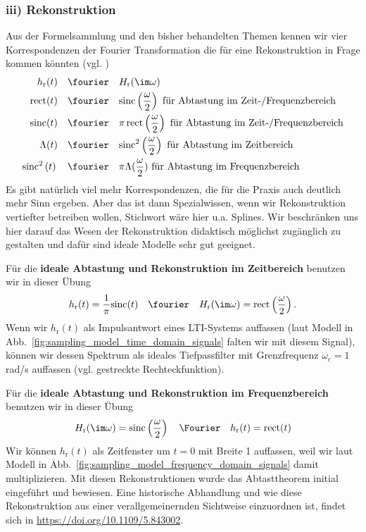 \subsubsection*{iii) Rekonstruktion}
Aus der Formelsammlung und den bisher behandelten Themen kennen wir vier
Korrespondenzen der Fourier Transformation die für eine Rekonstruktion
in Frage kommen könnten (vgl. )
\begin{align}
h_\mathrm{r}(t) \quad\fourier\quad  & H_\mathrm{r}(\im\omega)\\
\text{rect}(t) \quad\fourier\quad  &\text{sinc}\left( \frac{\omega}{2} \right)\text{ für Abtastung im Zeit-/Frequenzbereich}\\
\text{sinc}(t)  \quad\fourier\quad  &\pi \,\text{rect}\left(\frac{\omega}{2}\right)\text{ für Abtastung im Zeit-/Frequenzbereich}\\
\Lambda(t) \quad\fourier\quad  &\text{sinc}^2\left( \frac{\omega}{2} \right)  \text{ für Abtastung im Zeitbereich}\\
\text{sinc}^2\left( t \right) \quad\fourier\quad  &\pi\Lambda(\frac{\omega}{2})\text{ für Abtastung im Frequenzbereich}
\end{align}
Es gibt natürlich viel mehr Korrespondenzen, die für die Praxis auch deutlich mehr
Sinn ergeben. Aber das ist dann Spezialwissen, wenn wir
Rekonstruktion vertiefter betreiben wollen, Stichwort wäre hier u.a. Splines.
Wir beschränken uns hier darauf das Wesen der Rekonstruktion didaktisch möglichst
zugänglich zu gestalten und dafür sind ideale Modelle sehr gut geeignet.

Für die \textbf{ideale Abtastung und Rekonstruktion im Zeitbereich} benutzen
wir in dieser Übung
\begin{align}
h_\mathrm{r}(t) = \frac{1}{\pi}\text{sinc}(t)
\quad\fourier\quad
H_\mathrm{r}(\im\omega) = \text{rect}\left(\frac{\omega}{2}\right).
\end{align}
Wenn wir $h_\mathrm{r}(t)$ als Impulsantwort eines LTI-Systems auffassen (laut
Modell in Abb.~\ref{fig:sampling_model_time_domain_signals} falten wir mit diesem Signal), können wir
dessen Spektrum als ideales Tiefpassfilter mit Grenzfrequenz $\omega_c=1$ rad/s auffassen (vgl. gestreckte Rechteckfunktion).
%

Für die \textbf{ideale Abtastung und Rekonstruktion im Frequenzbereich} benutzen
wir in dieser Übung
\begin{align}
H_\mathrm{r}(\im\omega) = \text{sinc}\left( \frac{\omega}{2} \right)
\quad\Fourier\quad
h_\mathrm{r}(t)  = \text{rect}(t)
\end{align}
Wir können $h_\mathrm{r}(t)$ als Zeitfenster um $t=0$ mit Breite 1 auffassen,
weil wir laut Modell in Abb.~\ref{fig:sampling_model_frequency_domain_signals}
damit multiplizieren.
Mit diesen Rekonstruktionen wurde das Abtasttheorem initial eingeführt und
bewiesen. Eine historische Abhandlung und wie diese Rekonstruktion
aus einer verallgemeinernden Sichtweise einzuordnen ist, findet sich in
\url{https://doi.org/10.1109/5.843002}.

